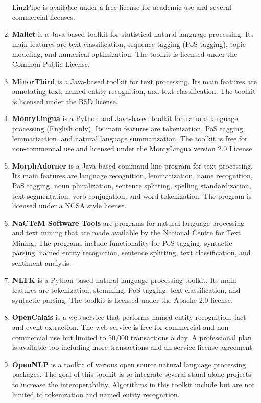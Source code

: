 \documentclass[a4paper,twoside]{book}      %
\begin{document}
\begin{enumerate}
LingPipe is available under a free license for academic use and several commercial licenses.
\item \textbf{Mallet} \cite{mccallum2002mallet} is a Java-based toolkit for statistical natural language processing. Its main features are text classification, sequence tagging (PoS tagging), topic modeling, and numerical optimization.
The toolkit is licensed under the Common Public License.
\item \textbf{MinorThird} \cite{cohen2004minorthird} is a Java-based toolkit for text processing. Its main features are annotating text, named entity recognition, and text classification.
The toolkit is licensed under the BSD license.
\item \textbf{MontyLingua} \cite{liu2004montylingua} is a Python and Java-based toolkit for natural language processing (English only). Its main features are tokenization, PoS tagging, lemmatization, and natural language summarization.
The toolkit is free for non-commercial use and licensed under the MontyLingua version 2.0 License.
\item \textbf{MorphAdorner} \cite{morphadorner} is a Java-based command line program for text processing. Its main features are language recognition, lemmatization, name recognition, PoS tagging, noun pluralization, sentence splitting, spelling standardization, text segmentation, verb conjugation, and word tokenization.
The program is licensed under a NCSA style license.
\item \textbf{NaCTeM Software Tools} \cite{nactem} are programs for natural language processing and text mining that are made available by the National Centre for Text Mining. The programs include functionality for PoS tagging, syntactic parsing, named entity recognition, sentence splitting, text classification, and sentiment analysis.
\item \textbf{NLTK} \cite{loper2002nltk} is a Python-based natural language processing toolkit. Its main features are tokenization, stemming, PoS tagging, text classification, and syntactic parsing.
The toolkit is licensed under the Apache 2.0 license.
\item \textbf{OpenCalais} \cite{opencalais} is a web service that performs named entity recognition, fact and event extraction.
The web service is free for commercial and non-commercial use but limited to 50,000 transactions a day. A professional plan is available too including more transactions and an service license agreement.
\item \textbf{OpenNLP} \cite{opennlp} is a toolkit of various open source natural language processing packages. The goal of this toolkit is to integrate several stand-alone projects to increase the interoperability. Algorithms in this toolkit include but are not limited to tokenization and named entity recognition.

\end{enumerate}
\end{document}
